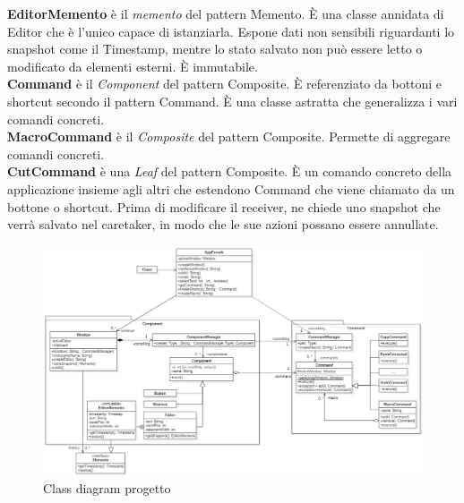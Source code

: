 \documentclass[12pt]{article}
\begin{document}
\textbf{EditorMemento} è il \emph{memento} del pattern Memento. È una classe annidata di Editor che è l'unico capace di istanziarla. Espone dati non sensibili riguardanti lo snapshot come il Timestamp, mentre lo stato salvato non può essere letto o modificato da elementi esterni. È immutabile.\\
\textbf{Command} è il \emph{Component} del pattern Composite. È referenziato da bottoni e shortcut secondo il pattern Command. È una classe astratta che generalizza i vari comandi concreti.\\
\textbf{MacroCommand} è il \emph{Composite} del pattern Composite. Permette di aggregare comandi concreti.\\
\textbf{CutCommand} è una \emph{Leaf} del pattern Composite. È un comando concreto della applicazione insieme agli altri che estendono Command che viene chiamato da un bottone o shortcut. Prima di modificare il receiver, ne chiede uno snapshot che verrà salvato nel caretaker, in modo che le sue azioni possano essere annullate.

\newpage
{}
\begin{landscape}
\begin{figure}[h!]
\centering
\includegraphics[scale=0.5]{project.png}
\caption{Class diagram progetto}
\label{fig:project}
\end{figure}
\end{landscape}
\restoregeometry
\end{document}
